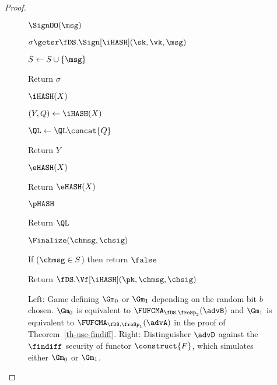 \begin{proof}
\begin{figure}[t]
{	\begin{oracle}{$\SignOO(\msg)$}
		\item $\sigma \getsr \fDS.\Sign[\iHASH](\sk, \vk, \msg)$
		\item $S \gets S \cup \{\msg\}$
		\item Return $\sigma$
	\end{oracle}
	\ExptSepSpace
	
	\begin{oracle}{$\iHASH(X)$}
		\item $(Y, Q) \gets \iHASH(X)$ 
		\item $\QL \gets \QL \concat \{Q\}$
		\item Return $Y$
	\end{oracle}
	\ExptSepSpace
	
	\begin{oracle}{$\eHASH(X)$}
		\item Return $\eHASH(X)$ 
	\end{oracle}
	\ExptSepSpace
	
	\begin{oracle}{$\pHASH$}
		\item Return $\QL$
	\end{oracle}
	\ExptSepSpace
	
	\begin{oracle}{$\Finalize(\chmsg, \chsig)$}
		\item If ($\chmsg\in S$) then return $\false$
		\item Return $\fDS.\Vf[\iHASH](\pk, \chmsg, \chsig)$ \vspace{2pt}
	\end{oracle}
		}
		\vspace{-5pt}
		\caption{
		Left: Game defining $\Gm_0$ or $\Gm_1$ depending on the random bit $b$ chosen. $\Gm_0$ is equivalent to $\FUFCMA_{\fDS,\froSp_2}(\advB)$ and $\Gm_1$ is equivalent to $\FUFCMA_{\fDS ,\froSp_1}(\advA)$ in the proof of Theorem~\ref{th-use-findiff}. Right: Distinguisher $\advD$ against the $\findiff$ security of functor $\construct{F}$, which simulates either $\Gm_0$ or $\Gm_1$.}
		\label{fig:gm-pf-th-comp-0-1}
		\hrulefill
		\vspace{-10pt}
	\end{figure}
	

\end{proof}
